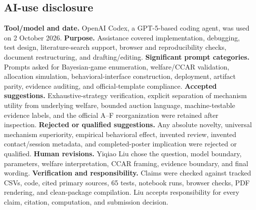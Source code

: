 \subsection{AI-use disclosure}
\textbf{Tool/model and date.} OpenAI Codex, a GPT-5-based coding agent, was used on 2 October 2026. \textbf{Purpose.} Assistance covered implementation, debugging, test design, literature-search support, browser and reproducibility checks, document restructuring, and drafting/editing. \textbf{Significant prompt categories.} Prompts asked for Bayesian-game enumeration, welfare/CCAR validation, allocation simulation, behavioral-interface construction, deployment, artifact parity, evidence auditing, and official-template compliance. \textbf{Accepted suggestions.} Exhaustive-strategy verification, explicit separation of mechanism utility from underlying welfare, bounded auction language, machine-testable evidence labels, and the official A--F reorganization were retained after inspection. \textbf{Rejected or qualified suggestions.} Any absolute novelty, universal mechanism superiority, empirical behavioral effect, invented review, invented contact/session metadata, and completed-poster implication were rejected or qualified. \textbf{Human revisions.} Yiqiao Liu chose the question, model boundary, parameters, welfare interpretation, CCAR framing, evidence boundary, and final wording. \textbf{Verification and responsibility.} Claims were checked against tracked CSVs, code, cited primary sources, 65 tests, notebook runs, browser checks, PDF rendering, and clean-package compilation. Liu accepts responsibility for every claim, citation, computation, and submission decision.

